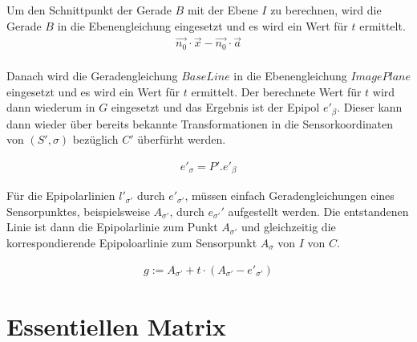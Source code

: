 %
Um den Schnittpunkt der Gerade $B$ mit der Ebene $I$ zu berechnen, wird die Gerade $B$ in die Ebenengleichung eingesetzt und es wird ein Wert für $t$ ermittelt. 
\begin{gather}
\vec{n_0}\cdot \vec{x} - \vec{n_0}\cdot \vec{a}\\
\end{gather}

Danach wird die Geradengleichung \ensuremath{BaseLine} in die Ebenengleichung \ensuremath{ImagePlane} eingesetzt und es wird ein Wert für \ensuremath{t} ermittelt. Der berechnete Wert für $t$ wird dann wiederum in $G$ eingesetzt und das Ergebnis ist der Epipol \ensuremath{e'_\beta}. Dieser kann dann wieder über bereits bekannte Transformationen in die Sensorkoordinaten von $(S',\sigma)$ bezüglich $C'$ überfürht werden.

\begin{gather}
e'_\sigma=P'.e'_\beta
\end{gather}

Für die Epipolarlinien $l'_{\sigma'}$ durch $e'_{\sigma'}$, müssen einfach Geradengleichungen eines Sensorpunktes, beispielsweise $A_{\sigma'}$, durch $e_{\sigma'}'$ aufgestellt werden. Die entstandenen Linie ist dann die Epipolarlinie zum Punkt $A_{\sigma'}$ und gleichzeitig die korrespondierende Epipoloarlinie zum Sensorpunkt $A_\sigma$ von $I$ von $C$.

\begin{gather}
	g:= A_{\sigma'} +t \cdot (A_{\sigma'}-e'_{\sigma'})
\end{gather}

\section{Essentiellen Matrix}


